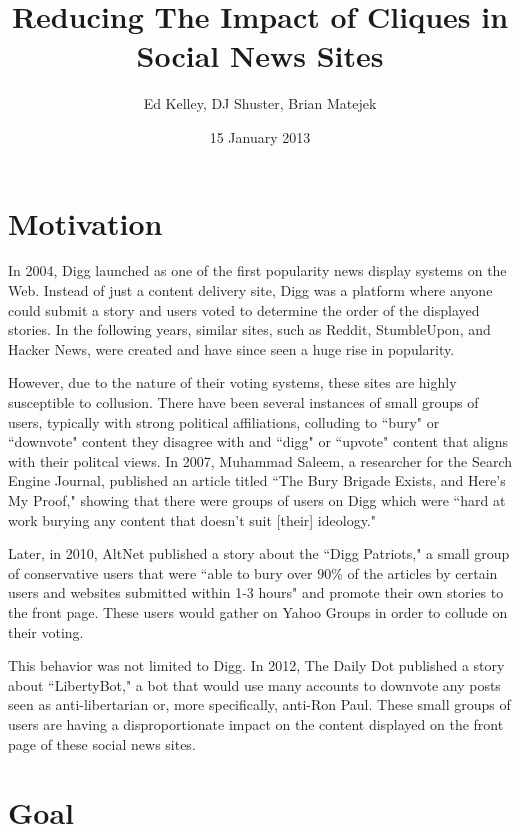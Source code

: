 \documentclass[12pt, oneside]{amsart}
\title{Reducing The Impact of Cliques in Social News Sites}
\author{Ed Kelley, DJ Shuster, Brian Matejek}
\date{15 January 2013}         %
\begin{document}
\begin{center}
\end{center}
\maketitle

\section{Motivation}
In 2004, Digg launched as one of the first  popularity news display systems on the Web. Instead of just a content delivery site, Digg was a platform where anyone could submit a story and users voted to determine the order of the displayed stories. In the following years, similar sites, such as Reddit, StumbleUpon, and Hacker News, were created and have since seen a huge rise in popularity.

However, due to the nature of their voting systems, these sites are highly susceptible to collusion. There have been several instances of small groups of users, typically with strong political affiliations, colluding to ``bury" or ``downvote" content they disagree with and ``digg" or ``upvote" content that aligns with their politcal views. In 2007, Muhammad Saleem, a researcher for the Search Engine Journal, published an article titled  ``The Bury Brigade Exists, and Here's My Proof," showing that there were groups of users on Digg which were ``hard at work burying any content that doesn't suit [their] ideology."\cite{wired, sej}

Later, in 2010, AltNet published a story about the ``Digg Patriots," a small group of conservative users that were ``able to bury over 90\% of the articles by certain users and websites submitted within 1-3 hours" and promote their own stories to the front page.\cite{alter net} These users would gather on Yahoo Groups in order to collude on their voting.

This behavior was not limited to Digg. In 2012, The Daily Dot published a story about ``LibertyBot," a bot that would use many accounts to downvote any posts seen as anti-libertarian or, more specifically, anti-Ron Paul.\cite{dailydot} These small groups of users are having a disproportionate impact on the content displayed on the front page of these social news sites.

\section{Goal}
\end{document}
